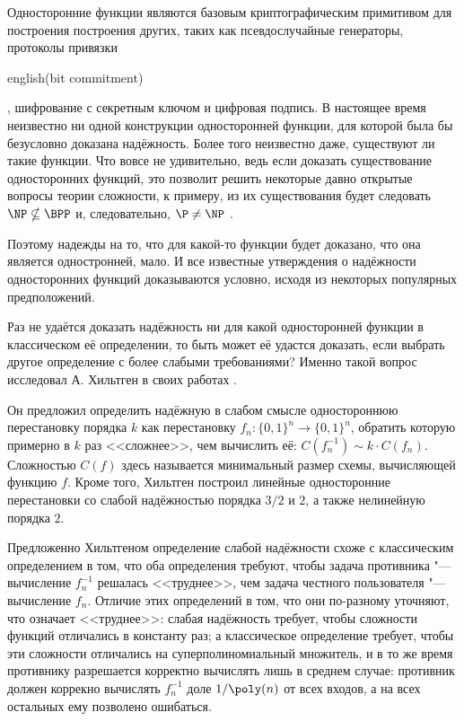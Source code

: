 \documentclass[oneside, a4paper]{article}
\theoremstyle{definition}
\theoremstyle{remark}
\begin{document}
Односторонние функции являются базовым криптографическим примитивом для
построения построения других, таких как псевдослучайные генераторы, протоколы
привязки \begin{foreignlanguage}{english}(bit commitment)\end{foreignlanguage},
шифрование с секретным ключом и цифровая подпись. В настоящее время неизвестно
ни одной конструкции односторонней функции, для которой была бы безусловно
доказана надёжность. Более того неизвестно даже, существуют ли такие функции.
Что вовсе не удивительно, ведь если доказать существование односторонних
функций, это позволит решить некоторые давно открытые вопросы теории
сложности, к примеру, из их существования будет следовать $\NP \nsubseteq
\BPP$ и, следовательно, $\P \neq \NP$ \cite{goldreich}.

Поэтому надежды на то, что для какой-то функции будет доказано, что она является
одностронней, мало. И все известные утверждения о надёжности односторонних
функций доказываются условно, исходя из некоторых популярных предположений.

Раз не удаётся доказать надёжность ни для какой односторонней функции в
классическом её определении, то быть может её удастся доказать, если выбрать
другое определение с более слабыми требованиями? Именно такой вопрос исследовал
А. Хильтген в своих работах \cite{hiltgen1993,hiltgen1994}.

Он предложил определить надёжную в слабом смысле одностороннюю перестановку
порядка $k$ как перестановку $f_n : \{0, 1\}^n \to \{0, 1\}^n$, обратить
которую примерно в $k$ раз <<сложнее>>, чем вычислить её: $C(f_n^{-1}) \sim k
\cdot C(f_n)$. Сложностью $C(f)$ здесь называется минимальный размер схемы,
вычисляющей функцию $f$. Кроме того, Хильтген построил линейные односторонние
перестановки со слабой надёжностью порядка $3/2$ и $2$, а также нелинейную
порядка $2$.

Предложенно Хильтгеном определение слабой надёжности схоже с классическим
определением в том, что оба определения требуют, чтобы задача противника "---
вычисление $f_n^{-1}$ решалась <<труднее>>, чем задача честного пользователя
"--- вычисление $f_n$. Отличие этих определений в том, что они по-разному
уточняют, что означает <<труднее>>: слабая надёжность требует, чтобы сложности
функций отличались в константу раз; а классическое определение требует, чтобы
эти сложности отличались на суперполиномиальный множитель, и в то же время
противнику разрешается корректно вычислять лишь в среднем случае: противник
должен коррекно вычислять $f_n^{-1}$ доле $1 / \poly(n)$ от всех входов, а на
всех остальных ему позволено ошибаться.
\end{document}
